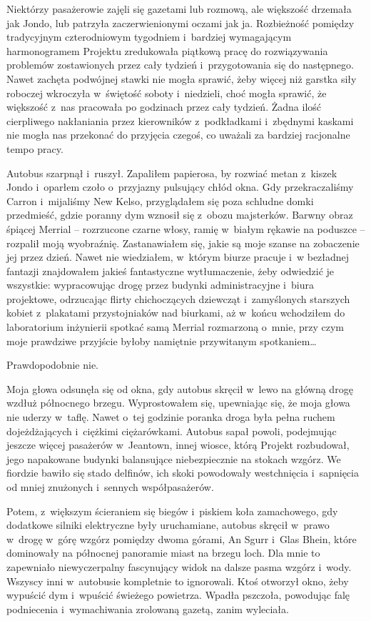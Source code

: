 \documentclass[oneside,polish,11pt,sfheadings]{mwbk}
\begin{document}
Niektórzy pasażerowie zajęli się gazetami lub rozmową, ale większość
drzemała jak Jondo, lub patrzyła zaczerwienionymi oczami jak ja.
Rozbieżność pomiędzy tradycyjnym czterodniowym tygodniem i~bardziej
wymagającym harmonogramem Projektu zredukowała piątkową pracę do
rozwiązywania problemów zostawionych przez cały tydzień i~przygotowania
się do następnego. Nawet zachęta podwójnej stawki nie mogła sprawić,
żeby więcej niż garstka siły roboczej wkroczyła w~świętość soboty i~niedzieli, choć mogła sprawić, że większość z~nas pracowała po godzinach
przez cały tydzień. Żadna ilość cierpliwego nakłaniania przez
kierowników z~podkładkami i~zbędnymi kaskami nie mogła nas przekonać do
przyjęcia czegoś, co uważali za bardziej racjonalne tempo pracy.

Autobus szarpnął i~ruszył. Zapaliłem papierosa, by rozwiać metan z~kiszek Jondo i~oparłem czoło o~przyjazny pulsujący chłód okna. Gdy
przekraczaliśmy Carron i~mijaliśmy New Kelso, przyglądałem się poza
schludne domki przedmieść, gdzie poranny dym wznosił się z~obozu
majsterków. Barwny obraz śpiącej Merrial -- rozrzucone czarne włosy,
ramię w~białym rękawie na poduszce -- rozpalił moją wyobraźnię.
Zastanawiałem się, jakie są moje szanse na zobaczenie jej przez dzień.
Nawet nie wiedziałem, w~którym biurze pracuje i~w bezładnej fantazji
znajdowałem jakieś fantastyczne wytłumaczenie, żeby odwiedzić je
wszystkie: wypracowując drogę przez budynki administracyjne i~biura
projektowe, odrzucając flirty chichoczących dziewcząt i~zamyślonych
starszych kobiet z~plakatami przystojniaków nad biurkami, aż w~końcu
wchodziłem do laboratorium inżynierii spotkać samą Merrial rozmarzoną o~mnie, przy czym moje prawdziwe przyjście byłoby namiętnie przywitanym
spotkaniem\ldots

Prawdopodobnie nie.

Moja głowa odsunęła się od okna, gdy autobus skręcił w~lewo na główną
drogę wzdłuż północnego brzegu. Wyprostowałem się, upewniając się, że
moja głowa nie uderzy w~taflę. Nawet o~tej godzinie poranka droga była
pełna ruchem dojeżdżających i~ciężkimi ciężarówkami. Autobus sapał
powoli, podejmując jeszcze więcej pasażerów w~Jeantown, innej wiosce,
którą Projekt rozbudował, jego napakowane budynki balansujące
niebezpiecznie na stokach wzgórz. We fiordzie bawiło się stado delfinów,
ich skoki powodowały westchnięcia i~sapnięcia od mniej znużonych i~sennych współpasażerów.

Potem, z~większym ścieraniem się biegów i~piskiem koła zamachowego, gdy
dodatkowe silniki elektryczne były uruchamiane, autobus skręcił w~prawo w~drogę w~górę wzgórz pomiędzy dwoma górami, An Sgurr i~Glas Bhein, które
dominowały na północnej panoramie miast na brzegu loch. Dla mnie to
zapewniało niewyczerpalny fascynujący widok na dalsze pasma wzgórz i~wody. Wszyscy inni w~autobusie kompletnie to ignorowali. Ktoś otworzył
okno, żeby wypuścić dym i~wpuścić świeżego powietrza. Wpadła pszczoła,
powodując falę podniecenia i~wymachiwania zrolowaną gazetą, zanim
wyleciała.
\end{document}
